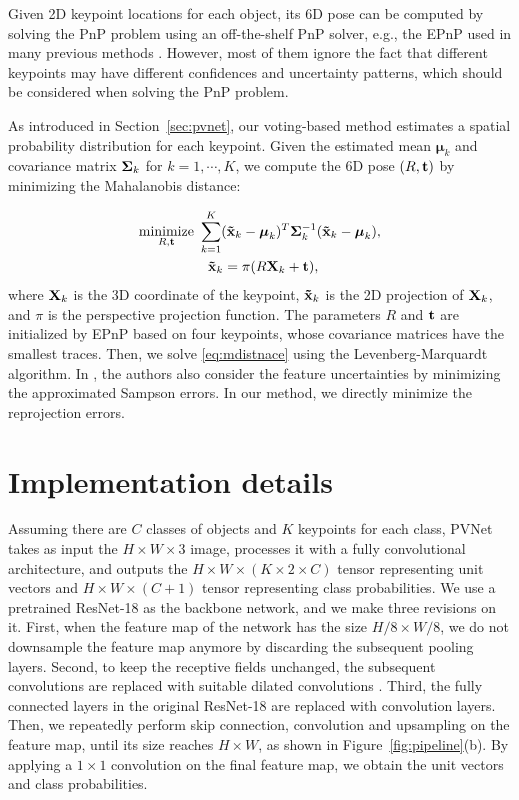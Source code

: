 \documentclass[10pt,twocolumn,letterpaper]{article}
\begin{document}
Given 2D keypoint locations for each object, its 6D pose can be computed by solving the PnP problem using an off-the-shelf PnP solver, e.g., the EPnP \cite{lepetit2009epnp} used in many previous methods \cite{tekin2018real,rad2017bb8}.
However, most of them ignore the fact that different keypoints may have different confidences and uncertainty patterns, which should be considered when solving the PnP problem.      



As introduced in Section~\ref{sec:pvnet}, our voting-based method estimates a spatial probability distribution for each keypoint. Given the estimated mean ${\boldsymbol \mu_k}$ and covariance matrix ${\bf \Sigma}_k$ for $k=1,\cdots,K$, we compute the 6D pose $(R,{\bf t})$ by minimizing the Mahalanobis distance:

\begin{equation}
\begin{split}
    \underset{R,{\bf t}}{\text{minimize}}~ &\sum\limits_{k=1}^{K} ({\bf \tilde{x}}_k - \boldsymbol\mu_k)^T {\bf \Sigma}_k^{-1} ({\bf \tilde{x}}_k -\boldsymbol\mu_k),
	\\
    &~~{\bf \tilde{x}}_k = \pi(R {\bf X}_k + {\bf t}),
    \label{eq:mdistnace}
\end{split}
\end{equation}
where ${\bf X}_k$ is the 3D coordinate of the keypoint, ${\bf \tilde{x}}_k$ is the 2D projection of ${\bf X}_k$, and $\pi$ is the perspective projection function. The parameters $R$ and $\bf t$ are initialized by EPnP \cite{lepetit2009epnp} based on four keypoints, whose covariance matrices have the smallest traces. Then, we solve \eqref{eq:mdistnace} using the Levenberg-Marquardt algorithm. In \cite{ferraz2014leveraging}, the authors also consider the feature uncertainties by minimizing the approximated Sampson errors. In our method, we directly minimize the reprojection errors.
 \section{Implementation details}
Assuming there are $C$ classes of objects and $K$ keypoints for each class, PVNet takes as input the $H\times W\times 3$ image, processes it with a fully convolutional architecture, and outputs the $H\times W\times (K\times 2\times C)$ tensor representing unit vectors and $H\times W \times (C+1)$ tensor representing class probabilities. We use a pretrained ResNet-18 \cite{he2016deep} as the backbone network, and we make three revisions on it. First, when the feature map of the network has the size $H/8\times W/8$, we do not downsample the feature map anymore by discarding the subsequent pooling layers. Second, to keep the receptive fields unchanged, the subsequent convolutions are replaced with suitable dilated convolutions \cite{YuKoltun2016}. Third, the fully connected layers in the original ResNet-18 are replaced with convolution layers. 
Then, we repeatedly perform skip connection, convolution and upsampling on the feature map, until its size reaches $H \times W$, as shown in Figure~\ref{fig:pipeline}(b). 
By applying a $1 \times 1$ convolution on the final feature map, we obtain the unit vectors and class probabilities.
\end{document}
